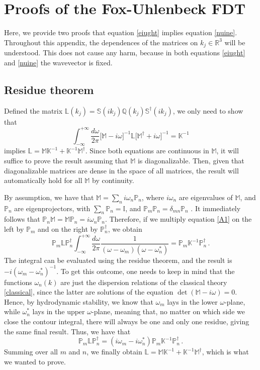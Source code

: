 \documentclass[a4paper, amsfonts, amssymb, amsmath, reprint, showkeys, nofootinbib, twoside,notitlepage,onecolumn]{revtex4-2}
\newcommand{\Ma}{{\mathbb{M}}}
\newcommand{\Sa}{{\mathbb{S}}}
\newcommand{\Qa}{{\mathbb{Q}}}
\newcommand{\Pa}{{\mathbb{P}}}
\newcommand{\Ia}{{\mathbb{I}}}
\newcommand{\Ka}{{\mathbb{K}}}
\newcommand{\La}{{\mathbb{L}}}
\theoremstyle{definition}
\begin{document}

\appendix



\section{Proofs of the Fox-Uhlenbeck FDT}\label{AAA}

Here, we provide two proofs that equation \eqref{eiught} implies equation \eqref{nuine}. Throughout this appendix, the dependences of the matrices on $k_j \in \mathbb{R}^3$ will be understood. This does not cause any harm, because in both equations \eqref{eiught} and \eqref{nuine} the wavevector is fixed.

\subsection{Residue theorem}\label{elgringooo}

Defined the matrix $\La(k_j)=\Sa(ik_j) \Qa(k_j) \Sa^\dagger(ik_j)$, we only need to show that
\begin{equation}\label{A1}
     \int_{-\infty}^{+\infty} \dfrac{d\omega}{2\pi} \big[\Ma{-}i\omega\big]^{-1}\La\big[\Ma^\dagger{+}i\omega\big]^{-1} = \Ka^{-1}    
\end{equation}
implies $\La =\Ma \Ka^{-1}+\Ka^{-1}\Ma^\dagger$. Since both equations are continuous in $\Ma$, it will suffice to prove the result assuming that $\Ma$ is diagonalizable. Then, given that diagonalizable matrices are dense in the space of all matrices, the result will automatically hold for all $\Ma$ by continuity. 

By assumption, we have that $\Ma=\sum_n i\omega_n \Pa_n$, where $i\omega_n$ are eigenvalues of $\Ma$, and $\Pa_n$ are eigenprojectors, with $\sum_n \Pa_n = \Ia$, and $\Pa_m \Pa_n = \delta_{mn}\Pa_n$ \cite{Kato_book}. It immediately follows that $\Pa_n \Ma = \Ma \Pa_n=i\omega_n \Pa_n$. Therefore, if we multiply equation \eqref{A1} on the left by $\Pa_m$ and on the right by $\Pa_n^\dagger$, we obtain
\begin{equation}
    \Pa_m \La \Pa_n^\dagger \int_{-\infty}^{+\infty} \dfrac{d\omega}{2\pi}  \dfrac{1}{(\omega-\omega_m)(\omega-\omega_n^*)} = \Pa_m \Ka^{-1} \Pa_n^\dagger \, .
\end{equation}
The integral can be evaluated using the residue theorem, and the result is $-i(\omega_m-\omega_n^*)^{-1}$. To get this outcome, one needs to keep in mind that the functions $\omega_n(k)$ are just the dispersion relations of the classical theory \eqref{classical}, since the latter are solutions of the equation $\det(\Ma-i\omega)=0$. Hence, by hydrodynamic stability, we know that $\omega_m$ lays in the lower $\omega$-plane, while $\omega_n^*$ lays in the upper $\omega$-plane, meaning that, no matter on which side we close the contour integral, there will always be one and only one residue, giving the same final result. Thus, we have that
\begin{equation}
    \Pa_m \La \Pa_n^\dagger = (i\omega_m-i\omega_n^*) \Pa_m \Ka^{-1} \Pa_n^\dagger \, .
\end{equation}
Summing over all $m$ and $n$, we finally obtain $\La=\Ma \Ka^{-1}+\Ka^{-1}\Ma^\dagger$, which is what we wanted to prove.
\end{document}
